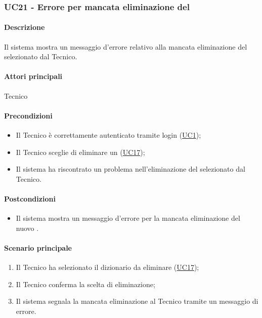 \subsubsection{UC21 - Errore per mancata eliminazione del }\label{UC21}
\paragraph*{Descrizione}
Il sistema mostra un messaggio d’errore relativo alla mancata eliminazione del  selezionato dal Tecnico.

\paragraph*{Attori principali}
Tecnico

\paragraph*{Precondizioni}
\begin{itemize}
  \item Il Tecnico è correttamente autenticato tramite login (\hyperref[UC1]{UC1});
  \item Il Tecnico sceglie di eliminare un  (\hyperref[UC17]{UC17});
  \item Il sistema ha riscontrato un problema nell'eliminazione del  selezionato dal Tecnico.
\end{itemize}

\paragraph*{Postcondizioni}
\begin{itemize}
  \item Il sistema mostra un messaggio d’errore per la mancata eliminazione del nuovo .
\end{itemize}

\paragraph*{Scenario principale}
\begin{enumerate}
  \item Il Tecnico ha selezionato il dizionario da eliminare (\hyperref[UC17]{UC17});
  \item Il Tecnico conferma la scelta di eliminazione;
  \item Il sistema segnala la mancata eliminazione al Tecnico tramite un messaggio di errore.
\end{enumerate}